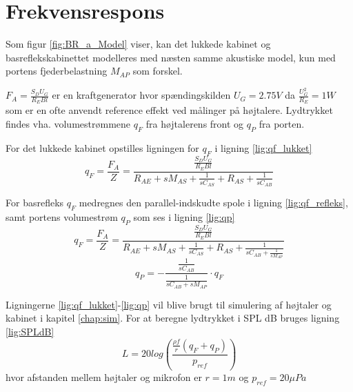 \chapter{Frekvensrespons}
Som figur \ref{fig:BR_a_Model} viser, kan det lukkede kabinet og basreflekskabinettet modelleres med næsten samme akustiske model, kun med portens fjederbelastning $M_{AP}$ som forskel. 

$F_A=\frac{S_D U_G}{R_E Bl}$ er en kraftgenerator hvor spændingskilden $U_G = 2.75V$ da $\frac{U_G ^2}{R_E}=1W $ som er en ofte anvendt reference effekt ved målinger på højtalere.
Lydtrykket findes vha. volumestrømmene $q_F$ fra højtalerens front og $q_P$ fra porten.

For det lukkede kabinet opstilles ligningen for $q_F$ i ligning \ref{lig:qf_lukket}
\begin{equation}\label{lig:qf_lukket}
q_F = \frac{F_A}{Z} = \frac{ \frac{S_D U_G}{R_E Bl} }{ R_{AE} + sM_{AS} + \frac{1}{ sC_{AS} } + R_{AS} + \frac{1}{sC_{AB} }}
\end{equation}

For basrefleks $ q_F $ medregnes den parallel-indskudte spole i ligning \ref{lig:qf_refleks}, samt portens volumestrøm $ q_P $ som ses i ligning \ref{lig:qp}
\begin{equation}\label{lig:qf_refleks}
q_F=\frac{F_A}{Z}=\frac{\frac{S_D U_G}{R_E Bl}}{ R_{AE}+sM_{AS}+ \frac{1}{sC_{AS} } + R_{AS} + \frac{1}{sC_{AB} + \frac{1}{sM_{AP}}}  }
\end{equation}
\begin{equation}\label{lig:qp}
q_P=-\frac{ \frac{1}{sC_{AB}} }{ \frac{1}{sC_{AB} +sM_{AP}  }}\cdot q_F
\end{equation}

Ligningerne \ref{lig:qf_lukket}-\ref{lig:qp} vil blive brugt til simulering af højtaler og kabinet i kapitel \ref{chap:sim}. For at beregne lydtrykket i SPL dB bruges ligning \ref{lig:SPLdB}
\begin{equation}\label{lig:SPLdB}
L=20 log( \frac{ \frac{\rho f}{r} (q_F+q_P) }{p_{ref}} )
\end{equation}
hvor afstanden mellem højtaler og mikrofon er $r=1m$ og $p_{ref}=20 \mu Pa $